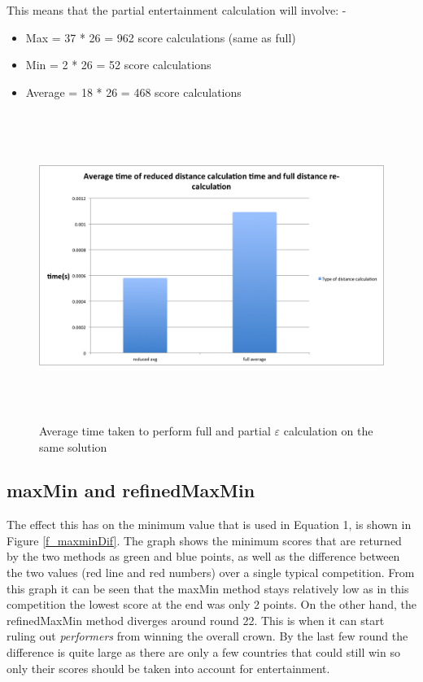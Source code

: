 \documentclass[12pt]{report}
\begin{document}
This means that the partial entertainment calculation will involve:
    - \begin{itemize}
\item Max = 37 * 26 = 962 score calculations (same as full)
\item Min = 2 * 26 = 52 score calculations
\item Average = 18 * 26 = 468 score calculations
\end{itemize}

\begin{figure}[H]
\centering
\includegraphics[width=17cm, height=10cm]{../code/misc/reducedvsFullDistanceCalc}
\caption{Average time taken to perform full and partial $\varepsilon$ calculation on the same solution}
\label{f_recalcComparison}
\end{figure}

\subsection{maxMin and refinedMaxMin}\label{maxMin}
The effect this has on the minimum value that is used in Equation 1, is shown in Figure \ref{f_maxminDif}. The graph shows the minimum scores that are returned by the two methods as green and blue points, as well as the difference between the two values (red line and red numbers) over a single typical competition. From this graph it can be seen that the maxMin method stays relatively low as in this competition the lowest score at the end was only 2 points. On the other hand, the refinedMaxMin method diverges around round 22. This is when it can start ruling out \textit{performers} from winning the overall crown. By the last few round the difference is quite large as there are only a few countries that could still win so only their scores should be taken into account for entertainment.
\end{document}

